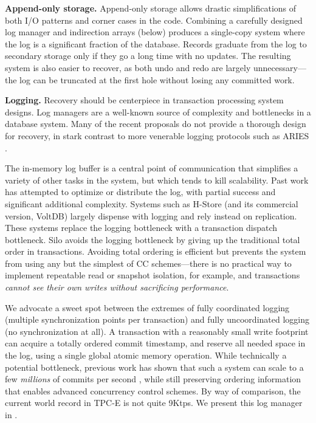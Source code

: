 \vspace{1mm} 
{\bf Append-only storage.}
Append-only storage allows drastic simplifications of both I/O patterns and corner cases in the code. Combining a carefully designed log manager and indirection arrays (below) produces a single-copy system where the log is a significant fraction of the database. Records graduate from the log to secondary storage only if they go a long time with no updates. The resulting system is also easier to recover, as both undo and redo are largely unnecessary---the log can be truncated at the first hole without losing any committed work.

\vspace{1mm} 
{\bf Logging.}
Recovery should be centerpiece in transaction processing system designs. Log managers are a well-known source of complexity and bottlenecks in a database system. Many of the recent proposals do not provide a thorough design for recovery, in stark contrast to more venerable logging protocols such as ARIES \cite{MohanHLPS92}.

The in-memory log buffer is a central point of communication that simplifies a variety of other tasks in the system, but which tends to kill scalability. Past work has attempted to optimize \cite{JohnsonPSAA10} or distribute \cite{WangJ14} the log, with partial success and significant additional complexity. Systems such as H-Store \cite{Kallman+08} (and its commercial version, VoltDB) largely dispense with logging and rely instead on replication. These systems replace the logging bottleneck with a transaction dispatch bottleneck. Silo avoids the logging bottleneck by giving up the traditional total order in transactions. Avoiding total ordering is efficient but prevents the system from using any but the simplest of CC schemes---there is no practical way to implement repeatable read or snapshot isolation, for example, and transactions {\it cannot see their own writes without sacrificing performance}.

We advocate a sweet spot between the extremes of fully coordinated logging (multiple synchronization points per transaction) and fully uncoordinated logging (no synchronization at all). A transaction with a reasonably small write footprint can acquire a totally ordered commit timestamp, and reserve all needed space in the log, using a single global atomic memory operation. While technically a potential bottleneck, previous work has shown that such a system can scale to a few {\em millions} of commits per second \cite{TuZKLM13}, while still preserving ordering information that enables advanced concurrency control schemes. By way of comparison, the current world record in TPC-E is not quite 9Ktps. We present this log manager in .

